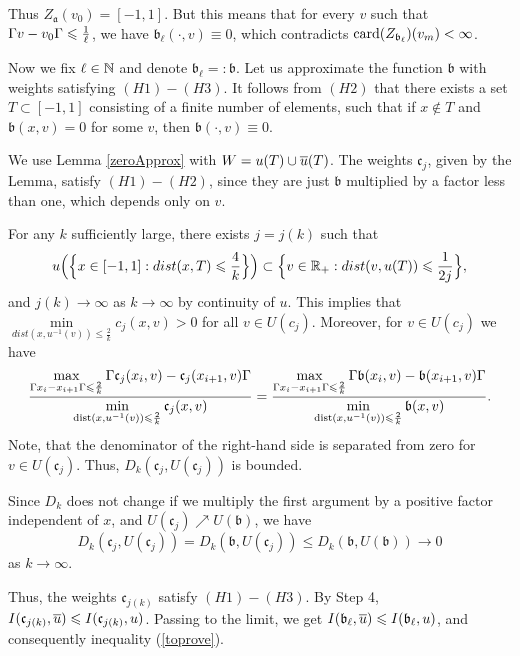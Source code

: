 Thus $Z_{\mathfrak a}(v_0) = [-1, 1]$.
But this means that for every $v$ such that $\abs{v - v_0} \le \frac{1}{\ell}$,
we have $\mathfrak b_{\ell}(\cdot, v) \equiv 0$,
which contradicts $\operatorname{card}(Z_{\mathfrak b_{\ell}})(v_m) < \infty$.

Now we fix $\ell \in \mathbb N$ and denote $\mathfrak b_{\ell} =: \mathfrak b$.
Let us approximate the function $\mathfrak b$ with weights satisfying $(H1)-(H3)$.
It follows from $(H2)$ that there exists a set $T \subset [-1, 1]$
consisting of a finite number of elements, such that
if $x \not\in T$ and $\mathfrak b(x, v) = 0$ for some $v$, then $\mathfrak b(\cdot, v) \equiv 0$.

We use Lemma \ref{zeroApprox} with $W = u(T) \cup \mon{u}(T)$.
The weights $\mathfrak c_j$, given by the Lemma, satisfy $(H1)-(H2)$,
since they are just $\mathfrak b$ multiplied by a factor less than one, which depends only on $v$.

For any $k$ sufficiently large, there exists $j = j(k)$ such that
$$u\Big( \Big\{ x \in [-1, 1]: dist(x, T) \le \frac{4}{k} \Big\} \Big) \subset \Big\{ v \in \Real_+: dist(v, u(T)) \le \frac{1}{2j} \Big\},$$
and $j(k) \to \infty$ as $k \to \infty$ by continuity of $u$.
This implies that $\min\limits_{dist(x, u^{-1}(v)) \le \frac{2}{k}} c_j(x, v) > 0$
for all $v \in U(c_j)$.
Moreover, for $v \in U(c_j)$ we have
$$
\frac{\max\limits_{\abs{x_i - x_{i + 1}} \le \frac{2}{k}} \abs{\mathfrak c_j(x_i, v) - \mathfrak c_j(x_{i + 1}, v)}}
{\min\limits_{\dist(x, u^{-1}(v)) \le \frac{2}{k}} \mathfrak c_j(x, v)}
=\frac{\max\limits_{\abs{x_i - x_{i + 1}} \le \frac{2}{k}} \abs{\mathfrak b(x_i, v) - \mathfrak b(x_{i + 1}, v)}}
{\min\limits_{\dist(x, u^{-1}(v)) \le \frac{2}{k}} \mathfrak b(x, v)}.
$$
Note, that the denominator of the right-hand side is separated from zero for $v \in U(\mathfrak c_j)$.
Thus, $D_k(\mathfrak c_j, U(\mathfrak c_j))$ is bounded.

Since $D_k$ does not change if we multiply the first argument by a positive factor independent of $x$,
and $U(\mathfrak c_j) \nearrow U(\mathfrak b)$, we have
$$D_k(\mathfrak c_j, U(\mathfrak c_j)) = D_k(\mathfrak b, U(\mathfrak c_j)) \le D_k(\mathfrak b, U(\mathfrak b)) \to 0$$
as $k \to \infty$.

Thus, the weights $\mathfrak c_{j(k)}$ satisfy $(H1)-(H3)$.
By Step 4, $I(\mathfrak c_{j(k)}, \mon{u}) \le I(\mathfrak c_{j(k)}, u)$.
Passing to the limit, we get $I(\mathfrak b_{\ell}, \mon{u}) \le I(\mathfrak b_{\ell}, u)$,
and consequently inequality (\ref{toprove}).

